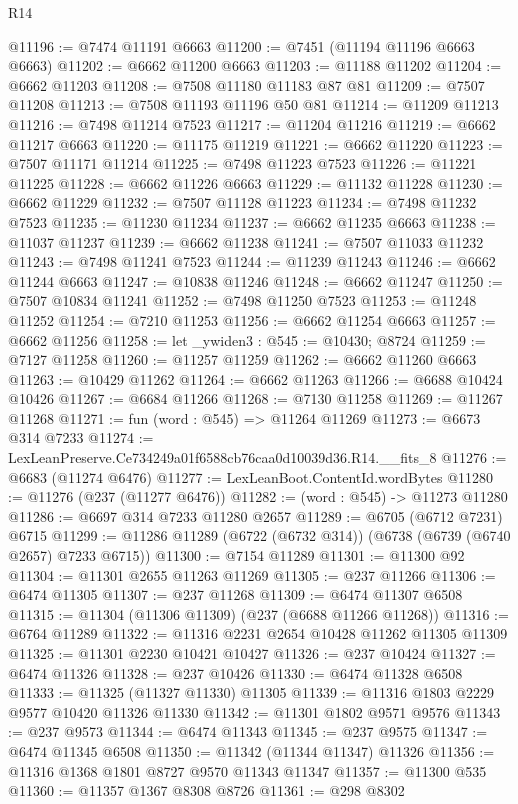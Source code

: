 \begin{lexlean}{R14}
\begin{coremodule}
@11196 := @7474 @11191 @6663
@11200 := @7451 (@11194 @11196 @6663 @6663)
@11202 := @6662 @11200 @6663
@11203 := @11188 @11202
@11204 := @6662 @11203
@11208 := @7508 @11180 @11183 @87 @81
@11209 := @7507 @11208
@11213 := @7508 @11193 @11196 @50 @81
@11214 := @11209 @11213
@11216 := @7498 @11214 @7523
@11217 := @11204 @11216
@11219 := @6662 @11217 @6663
@11220 := @11175 @11219
@11221 := @6662 @11220
@11223 := @7507 @11171 @11214
@11225 := @7498 @11223 @7523
@11226 := @11221 @11225
@11228 := @6662 @11226 @6663
@11229 := @11132 @11228
@11230 := @6662 @11229
@11232 := @7507 @11128 @11223
@11234 := @7498 @11232 @7523
@11235 := @11230 @11234
@11237 := @6662 @11235 @6663
@11238 := @11037 @11237
@11239 := @6662 @11238
@11241 := @7507 @11033 @11232
@11243 := @7498 @11241 @7523
@11244 := @11239 @11243
@11246 := @6662 @11244 @6663
@11247 := @10838 @11246
@11248 := @6662 @11247
@11250 := @7507 @10834 @11241
@11252 := @7498 @11250 @7523
@11253 := @11248 @11252
@11254 := @7210 @11253
@11256 := @6662 @11254 @6663
@11257 := @6662 @11256
@11258 := let _ywiden3 : @545 := @10430; @8724
@11259 := @7127 @11258
@11260 := @11257 @11259
@11262 := @6662 @11260 @6663
@11263 := @10429 @11262
@11264 := @6662 @11263
@11266 := @6688 @10424 @10426
@11267 := @6684 @11266
@11268 := @7130 @11258
@11269 := @11267 @11268
@11271 := fun (word : @545) => @11264 @11269
@11273 := @6673 @314 @7233
@11274 := LexLeanPreserve.Ce734249a01f6588cb76caa0d10039d36.R14.__fits_8
@11276 := @6683 (@11274 @6476)
@11277 := LexLeanBoot.ContentId.wordBytes
@11280 := @11276 (@237 (@11277 @6476))
@11282 := (word : @545) -> @11273 @11280
@11286 := @6697 @314 @7233 @11280 @2657
@11289 := @6705 (@6712 @7231) @6715
@11299 := @11286 @11289 (@6722 (@6732 @314)) (@6738 (@6739 (@6740 @2657) @7233 @6715))
@11300 := @7154 @11289
@11301 := @11300 @92
@11304 := @11301 @2655 @11263 @11269
@11305 := @237 @11266
@11306 := @6474 @11305
@11307 := @237 @11268
@11309 := @6474 @11307 @6508
@11315 := @11304 (@11306 @11309) (@237 (@6688 @11266 @11268))
@11316 := @6764 @11289
@11322 := @11316 @2231 @2654 @10428 @11262 @11305 @11309
@11325 := @11301 @2230 @10421 @10427
@11326 := @237 @10424
@11327 := @6474 @11326
@11328 := @237 @10426
@11330 := @6474 @11328 @6508
@11333 := @11325 (@11327 @11330) @11305
@11339 := @11316 @1803 @2229 @9577 @10420 @11326 @11330
@11342 := @11301 @1802 @9571 @9576
@11343 := @237 @9573
@11344 := @6474 @11343
@11345 := @237 @9575
@11347 := @6474 @11345 @6508
@11350 := @11342 (@11344 @11347) @11326
@11356 := @11316 @1368 @1801 @8727 @9570 @11343 @11347
@11357 := @11300 @535
@11360 := @11357 @1367 @8308 @8726
@11361 := @298 @8302

\end{coremodule}
\end{lexlean}
